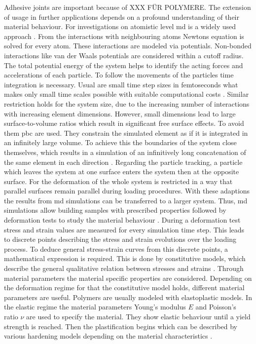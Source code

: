 Adhesive joints are important because of XXX FÜR POLYMERE. The extension of usage in further applications depends on a profound understanding of their material behaviour. For investigations on atomistic level \acrfull{md} is a widely used approach  \cite{ries_mechanical_2024}. From the interactions with neighbouring atoms Newtons equation is solved for every atom. These interactions are modeled via potentials. Non-bonded interactions like van der Waals potentials are considered within a cutoff radius. The total potential energy of the system helps to identify the acting forces and accelerations of each particle. To follow the movements of the particles time integration is necessary. Usual are small time step sizes in femtoseconds what makes only small time scales possible with suitable computational costs \cite{ries_mechanical_2024}. Similar restriction holds for the system size, due to the increasing number of interactions with increasing element dimensions. However, small dimensions lead to large surface-to-volume ratios which result in significant free surface effects. To avoid them \acrfull{pbc} are used. They constrain the simulated element as if it is integrated in an infinitely large volume. To achieve this the boundaries of the system close themselves, which results in a simulation of an infinitively long concatenation of the same element in each direction \cite{gorbunov_periodic_2022}. Regarding the particle tracking, a particle which leaves the system at one surface enters the system then at the opposite surface. For the deformation of the whole system is restricted in a way that parallel surfaces remain parallel during loading procedures. With these adaptions the results from \acrshort{md} simulations can be transferred to a larger system. Thus, \acrshort{md} simulations allow building samples with prescribed properties followed by deformation tests to study the material behaviour \cite{buyukozturk_structural_2011}. During a deformation test stress and strain values are measured for every simulation time step. This leads to discrete points describing the stress and strain evolutions over the loading process. To deduce general stress-strain curves from this discrete points, a mathematical expression is required. This is done by constitutive models, which describe the general qualitative relation between stresses and strains \cite{mergheim_lecture_nodate}. Through material parameters the material specific properties are considered.
Depending on the deformation regime for that the constitutive model holds, different material parameters are useful. Polymers are usually modeled with elastoplastic models. In the elastic regime the material  parameters  Young's modulus $E$ and Poisson's ratio $\nu$ are used to specify the material. They show elastic behaviour until a yield strength is reached. 
Then the plastification begins which can be described by various hardening models depending on the material characteristics \cite{mergheim_lecture_nodate}. 



